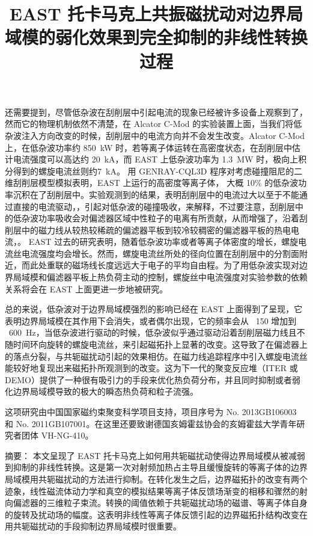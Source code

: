 还需要提到，尽管低杂波在刮削层中引起电流的现象已经被许多设备上观察到了，然而它的物理机制依然不清楚，在 Alcator C-Mod 的实验装置上面，当我们将低杂波注入方向改变的时候，刮削层中的电流方向并不会发生改变。Alcator C-Mod 上，在低杂波功率约 \SI{850}{\kilo\watt} 时，若等离子体运转在高密度状态，在刮削层中估计电流强度可以高达约 \SI{20}{\kilo\ampere}，而 EAST 上低杂波功率为 \SI{1.3}{\mega\watt} 时，极向上积分得到的螺旋电流丝则约\SI{7}{\kilo\ampere}。
用 GENRAY-CQL3D 程序对考虑碰撞阻尼的二维刮削层模型模拟表明，EAST 上运行的高密度等离子体， 大概 10\% 的低杂波功率沉积在了刮削层中。实验观测到的结果，表明刮削层中的电流过大以至于不能通过直接的电流驱动，，引起对低杂波的碰撞吸收，来解释，不过要注意，刮削层中的低杂波功率吸收会对偏滤器区域中性粒子的电离有所贡献，从而增强了，沿着刮削层中的磁力线从较热较稀疏的偏滤器平板到较冷较稠密的偏滤器平板的热电电流，。
EAST 过去的研究表明，随着低杂波功率或者等离子体密度的增长，螺旋电流丝电流强度均会增长。然而，螺旋电流丝所处的径向位置在刮削层中的分割面附近，而此处重联的磁场线长度远远大于电子的平均自由程。为了用低杂波实现对边界局域模和偏滤器平板上热负荷主动的控制，螺旋丝中电流强度对实验参数的依赖关系将会在 EAST 上面更进一步地被研究。

总的来说，低杂波对于边界局域模强烈的影响已经在 EAST 上面得到了呈现，它表明边界局域模在其作用下会消失，或者偶尔出现，它的频率会从 ~150 增加到 ~\SI{600}{\hertz}，当低杂波进行驱动的时候，低杂波似乎通过驱动沿着刮削层磁力线且不随时间环向旋转的螺旋电流丝，来引起磁拓扑上显著的改变。这导致了在偏滤器上的落点分裂，与共轭磁扰动引起的效果相仿。在磁力线追踪程序中引入螺旋电流丝能较好地复现出来磁拓扑所观测到的改变。这为下一代的聚变反应堆（ITER 或 DEMO）提供了一种很有吸引力的手段来优化热负荷分布，并且同时抑制或者弱化边界局域模导致的极大的瞬态热负荷和粒子流强。

这项研究由中国国家磁约束聚变科学项目支持，项目序号为 No. 2013GB106003 和 No. 2011GB107001。在这里还要致谢德国亥姆霍兹协会的亥姆霍兹大学青年研究者团体  VH-NG-410。



\title{EAST 托卡马克上共振磁扰动对边界局域模的弱化效果到完全抑制的非线性转换过程}

{\heiti 摘要：} 本文呈现了 EAST 托卡马克上如何用共轭磁扰动使得边界局域模从被减弱到抑制的非线性转换。这是第一次对射频加热占主导且缓慢旋转的等离子体的边界局域模用共轭磁扰动的方法进行抑制。在转化发生之后，边界磁拓扑的改变有两个迹象，线性磁流体动力学和真空的模拟结果等离子体反馈场渐变的相移和骤然的射向偏滤器的三维粒子束流。转换的阈值依赖于共轭磁扰动场的磁谱、等离子体自身的旋转及扰动场的幅度。这表明非线性等离子体反馈引起的边界磁拓扑结构改变在用共轭磁扰动的手段抑制边界局域模时很重要。


